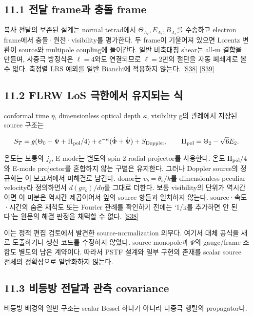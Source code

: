 \documentclass[11pt,a4paper]{article}
\begin{document}
\subsection*{11.1 전달 frame과 충돌 frame}

복사 전달의 보존된 설계는 normal tetrad에서 \(\Theta_{A_\ell},E_{A_\ell},B_{A_\ell}\)를 수송하고 electron frame에서 충돌·원천·visibility를 평가한다. 두 frame이 기울어져 있으면 Lorentz 변환이 source와 multipole coupling에 들어간다. 일반 비축대칭 shear는 all-m 결합을 만들며, 사중극 방정식은 \(\ell=4\)와도 연결되므로 \(\ell=2\)만의 절단을 자동 폐쇄계로 볼 수 없다. 축정렬 LRS 예외를 일반 Bianchi에 적용하지 않는다. \hyperlink{src:S38}{[S38]} \hyperlink{src:S39}{[S39]}


\subsection*{11.2 FLRW LoS 극한에서 유지되는 식}

conformal time \(\eta\), dimensionless optical depth \(\kappa\), visibility g의 관례에서 저장된 source 구조는


\[
S_T=g(\Theta_0+\Psi+\Pi_{\rm pol}/4)
+e^{-\kappa}(\dot\Phi+\dot\Psi)+S_{\rm Doppler},
\qquad \Pi_{\rm pol}=\Theta_2-\sqrt6 E_2.
\]

온도는 보통의 \(j_\ell\), E-mode는 별도의 spin-2 radial projector를 사용한다. 온도 \(\Pi_{\rm pol}/4\)와 E-mode projector를 혼합하지 않는 구별은 유지한다. 그러나 Doppler source의 정규화는 이 보고서에서 미해결로 남긴다. donor는 \(v_b=\theta_b/k\)를 dimensionless peculiar velocity라 정의하면서 \(d(gv_b)/d\eta\)를 그대로 더한다. 보통 visibility의 단위가 역시간이면 이 미분은 역시간 제곱이어서 앞의 source 항들과 일치하지 않는다. source·속도·시간의 숨은 재척도 또는 Fourier 관례를 확인하기 전에는 ‘1/k를 추가하면 안 된다’는 원문의 해결 판정을 채택할 수 없다. \hyperlink{src:S38}{[S38]}


이는 정적 편집 검토에서 발견한 source-normalization 의무다. 여기서 대체 공식을 새로 도출하거나 생산 코드를 수정하지 않았다. source monopole과 \(\Psi\)의 gauge/frame 조합도 별도의 남은 계약이다. 따라서 PSTF 설계와 일부 구현의 존재를 scalar source 전체의 정확성으로 일반화하지 않는다.


\subsection*{11.3 비등방 전달과 관측 covariance}

비등방 배경의 일반 구조는 scalar Bessel 하나가 아니라 다중극 행렬의 propagator다.
\end{document}
